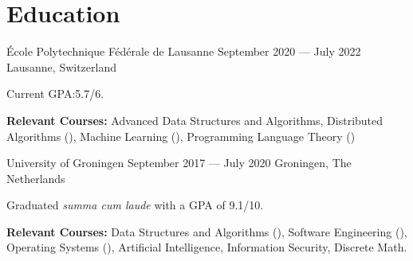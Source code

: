 \section*{Education}

\begin{cventries}
{École Polytechnique Fédérale de Lausanne} %
{September 2020 --- July 2022} %
{Lausanne, Switzerland} %
{%
  \begin{cvitems}
    \item Current GPA:\@ 5.7/6.
    \item \textbf{Relevant Courses:} Advanced Data Structures and Algorithms, Distributed Algorithms (), Machine Learning (), Programming Language Theory ()
  \end{cvitems}
}
{University of Groningen}  %
{September 2017 --- July 2020} %
{Groningen, The Netherlands} %
{%
  \begin{cvitems}
    \item Graduated \textit{summa cum laude} with a GPA of 9.1/10.
    \item \textbf{Relevant Courses:} Data Structures and Algorithms (), Software Engineering (), Operating Systems (), Artificial Intelligence, Information Security, Discrete Math.
  \end{cvitems}
}
\end{cventries}
